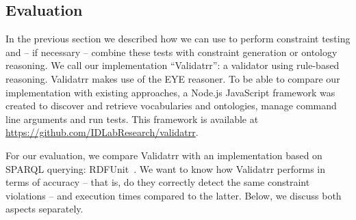 \subsection{Evaluation}
In the previous section we described how we can use \nthree to perform constraint testing and -- if necessary -- combine these tests with constraint generation or ontology reasoning.
We call our implementation \enquote{Validatrr}: a validator using rule-based reasoning. Validatrr makes use of the EYE reasoner.
To be able to compare our implementation with existing approaches, a Node.js JavaScript framework was created
to discover and retrieve vocabularies and ontologies, manage command line arguments and run tests.
This framework is available at \url{https://github.com/IDLabResearch/validatrr}.

For our evaluation, we compare Validatrr with an implementation based on SPARQL querying: RDFUnit~\cite{kontokostas2014test}. 
We want to know how Validatrr performs in terms of accuracy -- that is, do they correctly detect the same constraint violations -- and execution times 
compared to the latter. Below, we discuss both aspects separately.

